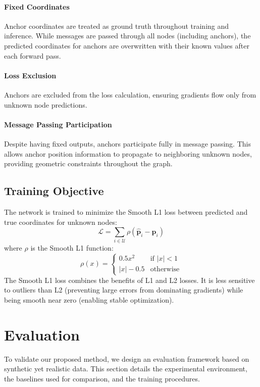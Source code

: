 \documentclass{ieeeaccess}
\begin{document}
\paragraph{Fixed Coordinates}
Anchor coordinates are treated as ground truth throughout training and inference. While messages are passed through all nodes (including anchors), the predicted coordinates for anchors are overwritten with their known values after each forward pass.

\paragraph{Loss Exclusion}
Anchors are excluded from the loss calculation, ensuring gradients flow only from unknown node predictions.

\paragraph{Message Passing Participation}
Despite having fixed outputs, anchors participate fully in message passing. This allows anchor position information to propagate to neighboring unknown nodes, providing geometric constraints throughout the graph.

\subsection{Training Objective}
The network is trained to minimize the Smooth L1 loss between predicted and true coordinates for unknown nodes:
\begin{equation}
\mathcal{L} = \sum_{i \in \mathcal{U}} \rho(\hat{\mathbf{p}}_i - \mathbf{p}_i)
\end{equation}
where $\rho$ is the Smooth L1 function:
\begin{equation}
\rho(x) = \begin{cases}
    0.5 x^2 & \text{if } |x| < 1 \\
    |x| - 0.5 & \text{otherwise}
\end{cases}
\end{equation}
The Smooth L1 loss combines the benefits of L1 and L2 losses. It is less sensitive to outliers than L2 (preventing large errors from dominating gradients) while being smooth near zero (enabling stable optimization).

\section{Evaluation}
\label{sec:evaluation}
To validate our proposed method, we design an evaluation framework based on synthetic yet realistic data. This section details the experimental environment, the baselines used for comparison, and the training procedures.
\end{document}
